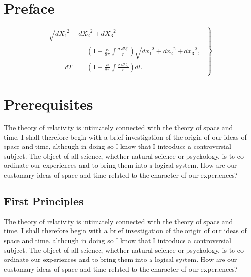 \documentclass{book}
\begin{document}
\addtocounter{page}{2}

\chapter*{Preface}

\[
\left.
\begin{aligned}
  &\sqrt{{dX_{1}}^{2} + {dX_{2}}^{2} + {dX_{3}}^{2}} \\
  &\qquad
  \begin{aligned}
  &= \left(1 + \frac{\kappa}{8\pi} \int \frac{\sigma\, dV_{0}}{r}\right)
     \sqrt{{dx_{1}}^{2} + {dx_{2}}^{2} + {dx_{3}}^{2}}, \\
dT &= \left(1 - \frac{\kappa}{8\pi} \int \frac{\sigma\, dV_{0}}{r}\right) dl.
\end{aligned}
\end{aligned}
\right\}
\]

\setcounter{tocdepth}{3}
\tableofcontents

\mainmatter

\chapter{Prerequisites}

The theory of relativity is intimately connected
with the theory of space and time. I shall therefore begin with a brief
investigation of the origin of our ideas of space and time, although in
doing so I know that I introduce a controversial subject. The object of all
science, whether natural science or psychology, is to co-ordinate our
experiences and to bring them into a logical system. How are our customary
ideas of space and time related to the character of our experiences?

\section{First Principles}

The theory of relativity is intimately connected
with the theory of space and time. I shall therefore begin with a brief
investigation of the origin of our ideas of space and time, although in
doing so I know that I introduce a controversial subject. The object of all
science, whether natural science or psychology, is to co-ordinate our
experiences and to bring them into a logical system. How are our customary
ideas of space and time related to the character of our experiences?
\end{document}
